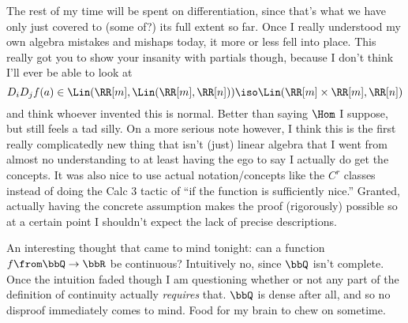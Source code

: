 \documentclass[12pt]{article}
\begin{document}
The rest of my time will be spent on differentiation, since that's what we have only just covered to
(some of?) its full extent so far. Once I really understood my own algebra mistakes and mishaps
today, it more or less fell into place. This really got you to show your insanity with partials though,
because I don't think I'll ever be able to look at
\[ D_{i}D_{j}f(a) \in \Lin(\RR[m], \Lin(\RR[m], \RR[n])) \iso \Lin(\RR[m] \times \RR[m], \RR[n]) \]
and think whoever invented this is normal. Better than saying $\Hom$ I suppose, but still feels a tad silly.
On a more serious note however, I think this is the first really complicatedly new thing that isn't (just)
linear algebra that I went from almost no understanding to at least having the ego to say I actually
do get the concepts. It was also nice to use actual notation/concepts like the $C^{r}$ classes
instead of doing the Calc 3 tactic of ``if the function is sufficiently nice.''
Granted, actually having the concrete assumption makes the proof (rigorously) possible so at a
certain point I shouldn't expect the lack of precise descriptions.

An interesting thought that came to mind tonight: can a function $f \from \bbQ \to \bbR$ be continuous?
Intuitively no, since $\bbQ$ isn't complete. Once the intuition faded though I am questioning whether or not
any part of the definition of continuity actually \emph{requires} that. $\bbQ$ is dense after all, and so
no disproof immediately comes to mind. Food for my brain to chew on sometime.
\end{document}
